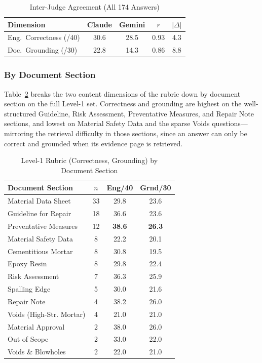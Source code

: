 \documentclass[10pt,a4paper,conference]{IEEEtran}
\begin{document}
\begin{table}[htbp]
\caption{Inter-Judge Agreement (All 174 Answers)}
\begin{center}
\footnotesize
\begin{tabular}{|l|c|c|c|c|}
\hline
\textbf{Dimension} & \textbf{Claude} & \textbf{Gemini} & \textbf{$r$} & \textbf{$|\Delta|$} \\
\hline
Eng.\ Correctness (/40) & 30.6 & 28.5 & 0.93 & 4.3 \\
\hline
Doc.\ Grounding (/30) & 22.8 & 14.3 & 0.86 & 8.8 \\
\hline
\end{tabular}
\label{tab:judge}
\end{center}
\end{table}

\subsubsection{By Document Section}
Table~\ref{tab:rubricsub} breaks the two content dimensions of the rubric down by
document section on the full Level-1 set. Correctness and grounding are highest
on the well-structured Guideline, Risk Assessment, Preventative Measures, and
Repair Note sections, and lowest on Material Safety Data and the sparse Voids
questions---mirroring the retrieval difficulty in those sections, since an answer
can only be correct and grounded when its evidence page is retrieved.

\begin{table}[htbp]
\caption{Level-1 Rubric (Correctness, Grounding) by Document Section}
\begin{center}
\footnotesize
\begin{tabular}{|p{}|c|c|c|}
\hline
\textbf{Document Section} & \textbf{$n$} & \textbf{Eng/40} & \textbf{Grnd/30} \\
\hline
Material Data Sheet & 33 & 29.8 & 23.6 \\
\hline
Guideline for Repair & 18 & 36.6 & 23.6 \\
\hline
Preventative Measures & 12 & \textbf{38.6} & \textbf{26.3} \\
\hline
Material Safety Data & 8 & 22.2 & 20.1 \\
\hline
Cementitious Mortar & 8 & 30.8 & 19.5 \\
\hline
Epoxy Resin & 8 & 29.8 & 22.4 \\
\hline
Risk Assessment & 7 & 36.3 & 25.9 \\
\hline
Spalling Edge & 5 & 30.0 & 21.6 \\
\hline
Repair Note & 4 & 38.2 & 26.0 \\
\hline
Voids (High-Str. Mortar) & 4 & 21.0 & 21.0 \\
\hline
Material Approval & 2 & 38.0 & 26.0 \\
\hline
Out of Scope & 2 & 33.0 & 22.0 \\
\hline
Voids \& Blowholes & 2 & 22.0 & 21.0 \\
\hline
\end{tabular}
\label{tab:rubricsub}
\end{center}
\end{table}
\end{document}

